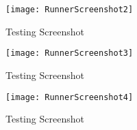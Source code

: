 \documentclass[a4paper, 11pt]{article}
\begin{document}
\begin{appendix}
\begin{multicols}{2}
\begin{figure}[H]
\centering
\texttt{[image: RunnerScreenshot2]}
\caption{Testing Screenshot}
\label{RunnerScreenshot2}
\end{figure}

\begin{figure}[H]
\centering
\texttt{[image: RunnerScreenshot3]}
\caption{Testing Screenshot}
\label{RunnerScreenshot3}
\end{figure}

\begin{figure}[H]
\centering
\texttt{[image: RunnerScreenshot4]}
\caption{Testing Screenshot}
\label{RunnerScreenshot4}
\end{figure}

\end{multicols}

\end{appendix}
\end{document}
